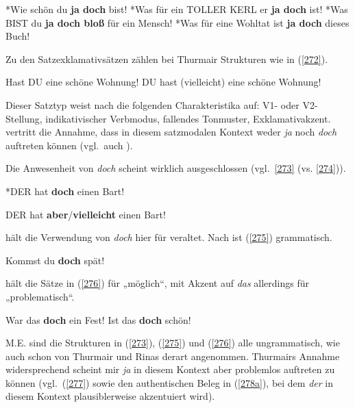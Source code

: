 \begin{exe}
	\ex\label{271} 
		\begin{xlist}	
			\ex\label{271a} *Wie schön du \textbf{ja doch} bist!	
			\ex\label{271b} *Was für ein TOLLER KERL er \textbf{ja doch} ist!
			\ex\label{271c} *Was BIST du \textbf{ja doch bloß} für ein Mensch!	
			\ex\label{271d} *Was für eine Wohltat ist \textbf{ja doch} dieses Buch!
		\end{xlist}
\end{exe}
Zu den Satzexklamativsätzen  zählen bei Thurmair Strukturen wie in (\ref{272}).

\begin{exe}
	\ex\label{272} 
		\begin{xlist}	
			\ex\label{272a} Hast DU eine schöne Wohnung!	
			\ex\label{272b} DU hast (vielleicht) eine schöne Wohnung!
		\end{xlist}
\end{exe}
Dieser Satztyp weist nach \citet[45]{Thurmair1989} die folgenden Charakteristika auf: V1- oder V2-Stellung, indikativischer Verbmodus, fallendes Tonmuster, Exklamativakzent. \citet[49]{Thurmair1989} vertritt die Annahme, dass in diesem satzmodalen Kontext weder \textit{ja} noch \textit{doch} auftreten können (vgl.\ auch \citealt[40]{Altmann1987}). 

Die Anwesenheit von \textit{doch} scheint wirklich ausgeschlossen (vgl.\ \ref{273} (vs. \ref{274})).

\begin{exe}
	\ex\label{273} 
	*DER hat \textbf{doch} einen Bart!
\end{exe}
	
\begin{exe}
	\ex\label{274} 
	DER hat \textbf{aber}/\textbf{vielleicht} einen Bart!	
			\hfill\hbox{\citet[218]{Rinas2006}}
\end{exe}																	     
\citet[141]{Hentschel1986} hält die Verwendung von \textit{doch} hier für veraltet. Nach \citet[26]{Weydt1969} ist (\ref{275}) grammatisch.

\begin{exe}
	\ex\label{275} 
	Kommst du \textbf{doch} spät!
\end{exe}
\citet[141]{Hentschel1986} hält die Sätze in (\ref{276}) für „möglich“, mit Akzent auf \textit{das} allerdings für  „problematisch“. 

\begin{exe}
	\ex\label{276} 
		\begin{xlist}	
			\ex\label{276a} War das \textbf{doch} ein Fest!	
			\ex\label{276b} Ist das \textbf{doch} schön!
		\end{xlist}
\end{exe}
M.E. sind die Strukturen in (\ref{273}), (\ref{275}) und (\ref{276}) alle ungrammatisch, wie auch schon von Thurmair und Rinas derart angenommen. Thurmairs Annahme widersprechend scheint mir \textit{ja} in diesem Kontext aber problemlos auftreten zu können (vgl.\ (\ref{277}) sowie den authentischen Beleg in (\ref{278a}), bei dem \textit{der} in diesem Kontext plausiblerweise akzentuiert wird).

